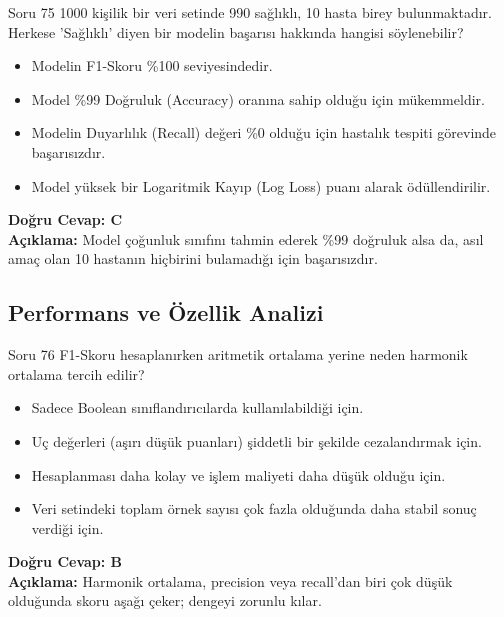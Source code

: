 \documentclass[12pt,a4paper]{article}
\begin{document}
\begin{testcard}{Soru 75}
    1000 kişilik bir veri setinde 990 sağlıklı, 10 hasta birey bulunmaktadır. Herkese 'Sağlıklı' diyen bir modelin başarısı hakkında hangisi söylenebilir?
    \begin{itemize}
        \item[A)] Modelin F1-Skoru \%100 seviyesindedir.
        \item[B)] Model \%99 Doğruluk (Accuracy) oranına sahip olduğu için mükemmeldir.
        \item[C)] Modelin Duyarlılık (Recall) değeri \%0 olduğu için hastalık tespiti görevinde başarısızdır.
        \item[D)] Model yüksek bir Logaritmik Kayıp (Log Loss) puanı alarak ödüllendirilir.
    \end{itemize}
    \tcblower
    \textbf{Doğru Cevap: C} \\
    \textbf{Açıklama:} Model çoğunluk sınıfını tahmin ederek \%99 doğruluk alsa da, asıl amaç olan 10 hastanın hiçbirini bulamadığı için başarısızdır.
\end{testcard}

\newpage
\subsection{Performans ve Özellik Analizi}

\begin{testcard}{Soru 76}
    F1-Skoru hesaplanırken aritmetik ortalama yerine neden harmonik ortalama tercih edilir?
    \begin{itemize}
        \item[A)] Sadece Boolean sınıflandırıcılarda kullanılabildiği için.
        \item[B)] Uç değerleri (aşırı düşük puanları) şiddetli bir şekilde cezalandırmak için.
        \item[C)] Hesaplanması daha kolay ve işlem maliyeti daha düşük olduğu için.
        \item[D)] Veri setindeki toplam örnek sayısı çok fazla olduğunda daha stabil sonuç verdiği için.
    \end{itemize}
    \tcblower
    \textbf{Doğru Cevap: B} \\
    \textbf{Açıklama:} Harmonik ortalama, precision veya recall'dan biri çok düşük olduğunda skoru aşağı çeker; dengeyi zorunlu kılar.
\end{testcard}
\end{document}
